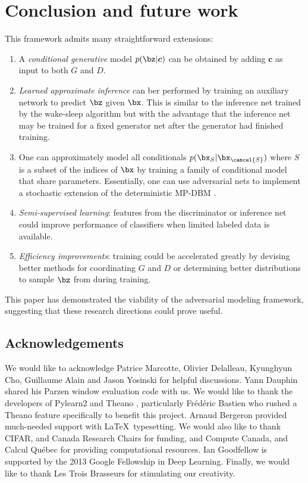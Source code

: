 \section{Conclusion and future work}

This framework admits many straightforward extensions:

\begin{enumerate}
	\item A \emph{conditional generative} model $p(\bz | \boldsymbol{c})$ can be obtained by adding $\boldsymbol{c}$ as input to both $G$ and $D$.
	\item \emph{Learned approximate inference} can ber performed by training an auxiliary network to predict $\bz$ given $\bx$. This is similar to the inference net trained by the wake-sleep algorithm \cite{15_doi:10.1126/science.7761831} but with the advantage that the inference net may be trained for a fixed generator net after the generator had finished training.
	\item One can approximately model all conditionals $p(\bx_S | \bx_{\cancel{S}})$ %
	where $S$ is a subset of the indices of $\bx$ by training a family of conditional model that share parameters. Essentially, one can use adversarial nets to implement a stochastic extension of the deterministic MP-DBM \cite{11_NIPS2013_0bb4aec1}.
	\item \emph{Semi-supervised learning}: features from the discriminator or inference net could improve performance of classifiers when limited labeled data is available.
	\item \emph{Efficiency improvements}: training could be accelerated greatly by devising better methods for coordinating $G$ and $D$ or determining better distributions to sample $\bz$ from during training.
\end{enumerate}

This paper has demonstrated the viability of the adversarial modeling framework, suggesting that these research directions could prove useful.

\subsection*{Acknowledgements}

We would like to acknowledge Patrice Marcotte, Olivier Delalleau, Kyunghyun Cho, Guillaume Alain and Jason Yosinski for helpful discussions. Yann Dauphin shared his Parzen window evaluation code with us. We would like to thank the developers of Pylearn2 \cite{12_goodfellow2013pylearn2machinelearningresearch} and Theano \cite{7_bergstra-proc-scipy-2010,1_bastien2012theanonewfeaturesspeed}, particularly Frédéric Bastien who rushed a Theano feature specifically to benefit this project. Arnaud Bergeron provided much-needed support with \LaTeX\ typesetting.  We would also like to thank CIFAR, and Canada Research Chairs for funding, and Compute Canada, and Calcul Québec for providing computational resources. Ian Goodfellow is supported by the 2013 Google Fellowship in Deep Learning. Finally, we would like to thank Les Trois Brasseurs for stimulating our creativity.
